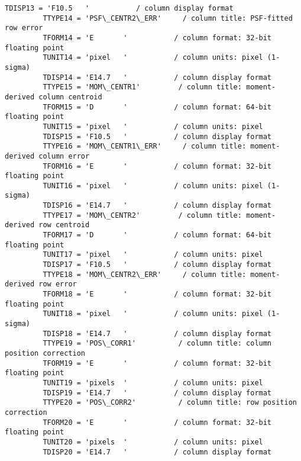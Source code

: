 \documentclass[11pt]{article}
\begin{document}
\begin{Verbatim}[commandchars=\\\{\}]
         TDISP13 = 'F10.5   '           / column display format                          
         TTYPE14 = 'PSF\_CENTR2\_ERR'     / column title: PSF-fitted row error             
         TFORM14 = 'E       '           / column format: 32-bit floating point           
         TUNIT14 = 'pixel   '           / column units: pixel (1-sigma)                  
         TDISP14 = 'E14.7   '           / column display format                          
         TTYPE15 = 'MOM\_CENTR1'         / column title: moment-derived column centroid   
         TFORM15 = 'D       '           / column format: 64-bit floating point           
         TUNIT15 = 'pixel   '           / column units: pixel                            
         TDISP15 = 'F10.5   '           / column display format                          
         TTYPE16 = 'MOM\_CENTR1\_ERR'     / column title: moment-derived column error      
         TFORM16 = 'E       '           / column format: 32-bit floating point           
         TUNIT16 = 'pixel   '           / column units: pixel (1-sigma)                  
         TDISP16 = 'E14.7   '           / column display format                          
         TTYPE17 = 'MOM\_CENTR2'         / column title: moment-derived row centroid      
         TFORM17 = 'D       '           / column format: 64-bit floating point           
         TUNIT17 = 'pixel   '           / column units: pixel                            
         TDISP17 = 'F10.5   '           / column display format                          
         TTYPE18 = 'MOM\_CENTR2\_ERR'     / column title: moment-derived row error         
         TFORM18 = 'E       '           / column format: 32-bit floating point           
         TUNIT18 = 'pixel   '           / column units: pixel (1-sigma)                  
         TDISP18 = 'E14.7   '           / column display format                          
         TTYPE19 = 'POS\_CORR1'          / column title: column position correction       
         TFORM19 = 'E       '           / column format: 32-bit floating point           
         TUNIT19 = 'pixels  '           / column units: pixel                            
         TDISP19 = 'E14.7   '           / column display format                          
         TTYPE20 = 'POS\_CORR2'          / column title: row position correction          
         TFORM20 = 'E       '           / column format: 32-bit floating point           
         TUNIT20 = 'pixels  '           / column units: pixel                            
         TDISP20 = 'E14.7   '           / column display format                          

\end{Verbatim}
\end{document}
